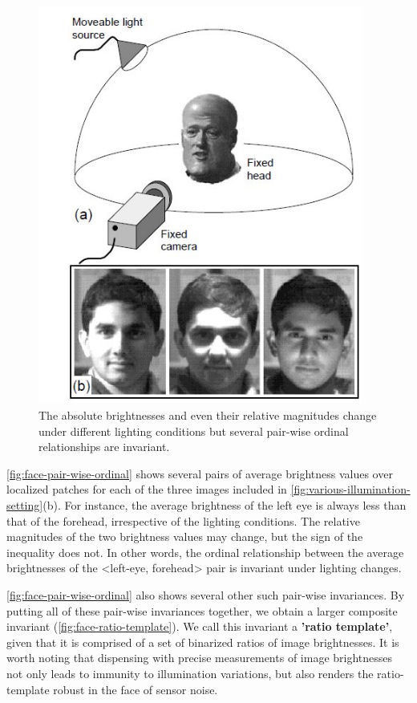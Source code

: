 \documentclass[a4paper,12pt]{article}
\begin{document}
\begin{figure}[ht]
  \centering
  \includegraphics[width=0.95\textwidth, keepaspectratio=true]{various-illumination-setting.jpg}
  \caption{The absolute brightnesses and even their relative magnitudes change under 
  different lighting conditions but several pair-wise ordinal relationships are invariant. \cite{Sinha:2002:QRR:648248.751730}}
 \label{fig:various-illumination-setting}
\end{figure}

\autoref{fig:face-pair-wise-ordinal} shows several pairs of average brightness values over localized patches
for each of the three images included in \autoref{fig:various-illumination-setting}(b).
For instance, the average brightness of the left eye is always less than that of the forehead, 
irrespective of the lighting conditions. The relative magnitudes of the two brightness values may change, 
but the sign of the inequality does not. In other words, the ordinal relationship between the average
brightnesses of the <left-eye, forehead> pair is invariant under lighting changes.

\autoref{fig:face-pair-wise-ordinal} also shows several other such pair-wise invariances. 
By putting all of these pair-wise invariances together, we obtain a larger composite invariant 
(\autoref{fig:face-ratio-template}). We call this invariant a \textbf{'ratio template'}, 
given that it is comprised of a set of binarized ratios of image brightnesses. 
It is worth noting that dispensing with precise measurements of image brightnesses not only leads to immunity to illumination variations, but also renders the ratio-template robust in the face of sensor noise. 
\end{document}
